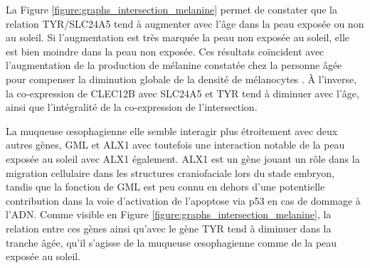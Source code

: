 La Figure \ref{figure:graphs_intersection_melanine} permet de constater que la relation TYR/SLC24A5 tend à augmenter avec l'âge dans la peau exposée ou non au soleil. Si l'augmentation est très marquée la peau non exposée au soleil, elle est bien moindre dans la peau non exposée. Ces résultats coïncident avec l'augmentation de la production de mélanine constatée chez la personne âgée pour compenser la diminution globale de la densité de mélanocytes . À l'inverse, la co-expression de CLEC12B avec SLC24A5 et TYR tend à diminuer avec l'âge, ainsi que l'intégralité de la co-expression de l'intersection.

La muqueuse œsophagienne elle semble interagir plus étroitement avec deux autres gènes, GML et ALX1 avec toutefois une interaction notable de la peau exposée au soleil avec ALX1 également. ALX1 est un gène jouant un rôle dans la migration cellulaire dans les structures craniofaciale lors du stade embryon, tandis que la fonction de GML est peu connu en dehors d'une potentielle contribution dans la voie d'activation de l'apoptose via p53 en cas de dommage à l'ADN. Comme visible en Figure \ref{figure:graphs_intersection_melanine}, la relation entre ces gènes ainsi qu'avec le gène TYR tend à diminuer dans la tranche âgée, qu'il s'agisse de la muqueuse œsophagienne comme de la peau exposée au soleil.

